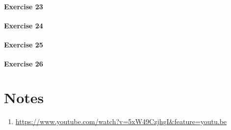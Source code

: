 \documentclass[a4paper,10pt]{article}
\begin{document}
\paragraph{Exercise 23}
\label{ex23a}
\paragraph{Exercise 24}
\label{ex24a}
\paragraph{Exercise 25}
\label{ex25a}
\paragraph{Exercise 26}
\label{ex26a}





\section*{Notes}

\paragraph{}
\begin{enumerate}
    \item \url{https://www.youtube.com/watch?v=5xW49CzjhgI&feature=youtu.be}
\end{enumerate}
\end{document}
